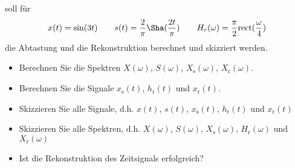soll für
\begin{align}
x(t)= \sin(3 t)\qquad
%
s(t) = \frac{2}{\pi} {\Sha}(\frac{2 t}{\pi})\qquad
%
H_r(\omega) = \frac{\pi}{2}\mathrm{rect}(\frac{\omega}{4})
\end{align}
die Abtastung und die Rekonstruktion berechnet und skizziert werden.

\begin{itemize}
  \item Berechnen Sie die Spektren $X(\omega)$, $S(\omega)$, $X_\mathrm{s}(\omega)$, $X_\mathrm{r}(\omega)$.
  \item Berechnen Sie die Signale $x_\mathrm{s}(t)$, $h_\mathrm{r}(t)$ und $x_\mathrm{r}(t)$.
  \item Skizzieren Sie alle Signale, d.h. $x(t)$, $s(t)$, $x_\mathrm{s}(t)$, $h_\mathrm{r}(t)$ und $x_\mathrm{r}(t)$
  \item Skizzieren Sie alle Spektren, d.h.  $X(\omega)$, $S(\omega)$, $X_\mathrm{s}(\omega)$, $H_\mathrm{r}(\omega)$ und $X_\mathrm{r}(\omega)$
  \item Ist die Rekonstruktion des Zeitsignals erfolgreich?
\end{itemize}






